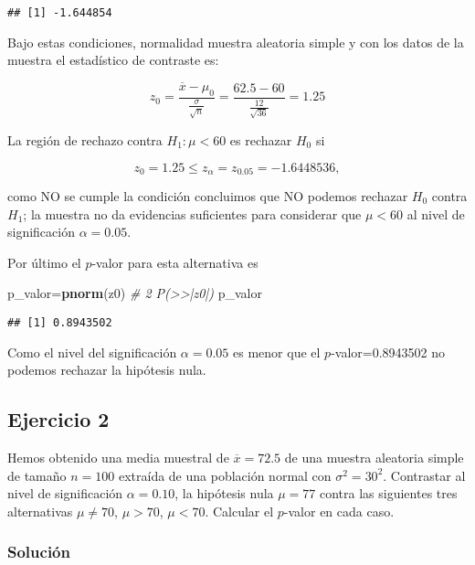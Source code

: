 \documentclass[
]{article}
\newenvironment{Shaded}{\begin{snugshade}}{\end{snugshade}}
\newcommand{\CommentTok}[1]{\textcolor[rgb]{0.56,0.35,0.01}{\textit{#1}}}
\newcommand{\KeywordTok}[1]{\textcolor[rgb]{0.13,0.29,0.53}{\textbf{#1}}}
\newcommand{\NormalTok}[1]{#1}
\begin{document}
\begin{verbatim}
## [1] -1.644854
\end{verbatim}

Bajo estas condiciones, normalidad muestra aleatoria simple y con los
datos de la muestra el estadístico de contraste es:

\[z_0=\frac{\overline{x}-\mu_0}{\frac{\sigma}{\sqrt{n}}}=
\frac{62.5-60}{\frac{12}{\sqrt{36}}}
=1.25\]

La región de rechazo contra \(H_1:\mu <60\) es rechazar \(H_0\) si

\[z_0=1.25\leq z_{\alpha}=z_{0.05}=-1.6448536,\]

como NO se cumple la condición concluimos que NO podemos rechazar
\(H_0\) contra \(H_1\); la muestra no da evidencias suficientes para
considerar que \(\mu< 60\) al nivel de significación \(\alpha=0.05\).

Por último el \(p\)-valor para esta alternativa es

\begin{Shaded}
\begin{Highlighting}[]
\NormalTok{p_valor=}\KeywordTok{pnorm}\NormalTok{(z0) }\CommentTok{# 2 P(>>|z0|)}
\NormalTok{p_valor}
\end{Highlighting}
\end{Shaded}

\begin{verbatim}
## [1] 0.8943502
\end{verbatim}

Como el nivel del significación \(\alpha=0.05\) es menor que el
\(p\)-valor=0.8943502 no podemos rechazar la hipótesis nula.

\hypertarget{ejercicio-2}{%
\subsection{Ejercicio 2}\label{ejercicio-2}}

Hemos obtenido una media muestral de \(\overline{x}=72.5\) de una
muestra aleatoria simple de tamaño \(n=100\) extraída de una población
normal con \(\sigma^2=30^2\). Contrastar al nivel de significación
\(\alpha=0.10\), la hipótesis nula \(\mu=77\) contra las siguientes tres
alternativas \(\mu\not= 70\), \(\mu>70\), \(\mu<70\). Calcular el
\(p\)-valor en cada caso.

\hypertarget{soluciuxf3n-1}{%
\subsubsection{Solución}\label{soluciuxf3n-1}}
\end{document}
